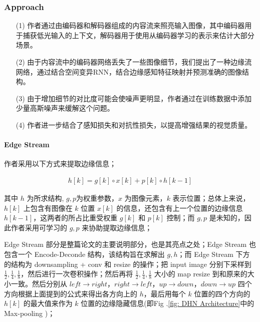 \documentclass[a4paper]{ctexart}
\begin{document}
	\subsubsection{Approach}
	
	\begin{itemize}
		\item[(1)] 
		作者通过由编码器和解码器组成的内容流来照亮输入图像，其中编码器用于捕获低光输入的上下文，解码器用于使用从编码器学习的表示来估计大部分场景。
		
		\item[(2)]
		由于内容流中的编码器网络丢失了一些图像细节，我们提出了一种边缘流网络，通过结合空间变异RNN，结合边缘感知特征映射并预测准确的图像结构。
		
		\item[(3)]
		由于增加细节的对比度可能会使噪声更明显，作者通过在训练数据中添加少量高斯噪声来缓解这个问题。
		
		\item[(4)]
		作者进一步结合了感知损失和对抗性损失，以提高增强结果的视觉质量。
		
	\end{itemize}	
	
	\paragraph{Edge Stream}
	
	作者采用以下方式来提取边缘信息；
	
	\begin{equation}
		\begin{aligned}
			h \left[k\right] = g \left[k\right] \circ x \left[k\right] + p \left[k\right] \circ h \left[k-1\right]
		\end{aligned}
		\label{eq: max and avg}
	\end{equation}
	
	其中 $h$ 为所求结构, $g, p$为权重参数，$x$ 为图像元素，$k$ 表示位置；总体上来说，$h\left[k\right]$ 上包含有图像在 $k$ 位置 $x\left[k\right]$ 的信息，还包含有上一个位置的边缘信息 $h\left[k-1\right]$，这两者的所占比重受权重 $g\left[k\right]$ 和 $p\left[k\right]$ 控制；而 $g, p$ 是未知的，因此作者采用可学习的 $g, p$ 来协助提取边缘信息；
	
	Edge Stream 部分是整篇论文的主要说明部分，也是其亮点之处；Edge Stream 也包含一个 Encode-Deconde 结构，该结构旨在求解出 $g, h$；而 Edge Stream 下方的结构为 downsampling + conv 和 resize 的操作；把 input image 分别下采样到 $\frac{1}{2}, \frac{1}{4}, \frac{1}{8}$，然后进行一次卷积操作；然后再将 $\frac{1}{2}, \frac{1}{4}, \frac{1}{8}$ 大小的 map resize 到和原来的大小一致。然后分别从 $left \rightarrow right$，$right \rightarrow left$，$up \rightarrow down$，$down \rightarrow up$ 四个方向根据上面提到的公式来得出各方向上的 $h$，最后用每个 $k$ 位置的四个方向的 $h\left[k\right]$ 的最大值来作为 $k$ 位置的边缘隐藏信息(即Fig .\ref{fig: DHN Architecture}中的 Max-pooling )；
	
\end{document}
